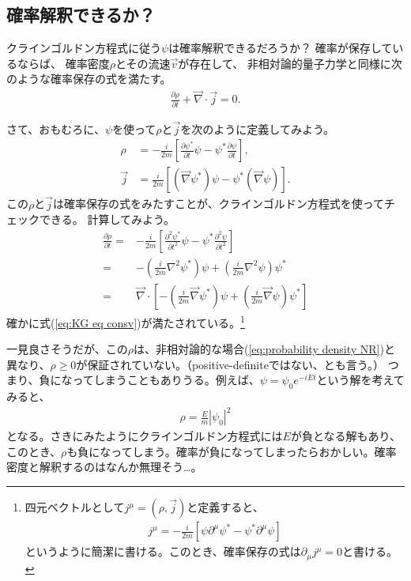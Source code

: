 \documentclass[10pt,a4paper]{jarticle}
\begin{document}
\subsection{確率解釈できるか？}
クラインゴルドン方程式に従う$\psi$は確率解釈できるだろうか？
確率が保存しているならば、 確率密度$\rho$とその流速$\vec v$が存在して、
非相対論的量子力学と同様に次のような確率保存の式を満たす。
\begin{align}
\frac{\partial\rho}{\partial t} + \vec\nabla \cdot \vec j = 0. \label{eq:KG eq consv}
\end{align}

さて、おもむろに、$\psi$を使って$\rho$と$\vec j$を次のように定義してみよう。
\begin{align}
\rho &= -\frac{i}{2m} [ \frac{\partial\psi^*}{\partial t} \psi - \psi^* \frac{\partial\psi}{\partial t} ], \\
\vec j &= \frac{i}{2m} [ (\vec\nabla\psi^*) \psi - \psi^* (\vec\nabla\psi) ].
\end{align}
%
この$\rho$と$\vec j$は確率保存の式をみたすことが、クラインゴルドン方程式を使ってチェックできる。
計算してみよう。
\begin{align}
\frac{\partial \rho}{\partial t}
=& -\frac{i}{2m} [ \frac{\partial^2\psi^*}{\partial t^2} \psi - \psi^* \frac{\partial^2\psi}{\partial t^2} ] \nonumber\\
=& -\left( \frac{i}{2m} \nabla^2 \psi^* \right) \psi + \left( \frac{i}{2m} \nabla^2 \psi \right) \psi^* \nonumber\\
=& \vec\nabla \cdot \left[ -\left( \frac{i}{2m} \vec\nabla \psi^* \right) \psi + \left( \frac{i}{2m} \vec\nabla \psi \right) \psi^* \right]
\end{align}
確かに式(\ref{eq:KG eq consv})が満たされている。\footnote{
四元ベクトルとして$j^\mu = (\rho, \vec j)$と定義すると、
\begin{align}
j^\mu = -\frac{i}{2m}[\psi \partial^\mu \psi^* - \psi^* \partial^\mu \psi  ]
\end{align}
というように簡潔に書ける。このとき、確率保存の式は$\partial_\mu j^\mu = 0$と書ける。
}

一見良さそうだが、この$\rho$は、非相対論的な場合(\ref{eq:probability density NR})と異なり、$\rho \geq 0$が保証されていない。（positive-definiteではない、とも言う。）
つまり、負になってしまうこともありうる。例えば、$\psi = \psi_0 e^{-iEt}$という解を考えてみると、
\begin{align}
\rho = \frac{E}{m} |\psi_0|^2
\end{align}
となる。さきにみたようにクラインゴルドン方程式には$E$が負となる解もあり、このとき、$\rho$も負になってしまう。確率が負になってしまったらおかしい。確率密度と解釈するのはなんか無理そう…。
\end{document}
